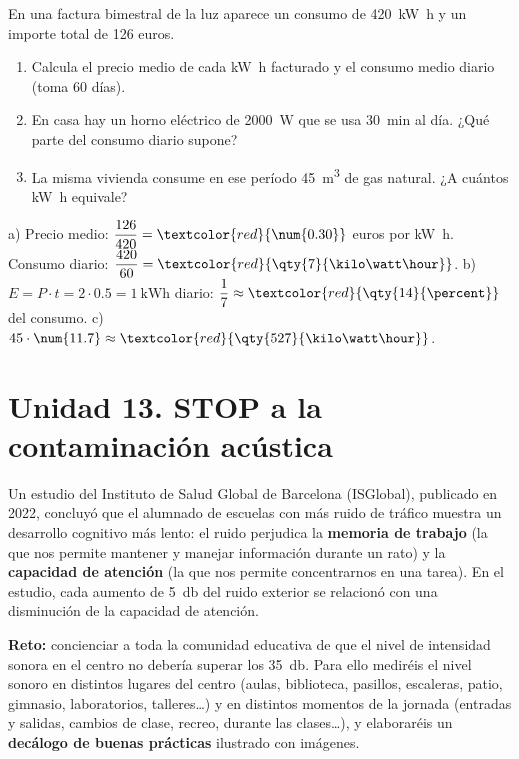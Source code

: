 \begin{exercise}
    En una factura bimestral de la luz aparece un consumo de \qty{420}{\kilo\watt\hour} y un importe total de 126 euros.
    \begin{enumerate}[label=\alph*)]
        \item Calcula el precio medio de cada \unit{\kilo\watt\hour} facturado y el consumo medio diario (toma 60 días).
        \item En casa hay un horno eléctrico de \qty{2000}{\watt} que se usa \qty{30}{\minute} al día. ¿Qué parte del consumo diario supone?
        \item La misma vivienda consume en ese período \qty{45}{\cubic\m} de gas natural. ¿A cuántos \unit{\kilo\watt\hour} equivale?
    \end{enumerate}
    \begin{solu}
        a) Precio medio: \(\dfrac{126}{420} = \textcolor{red}{\num{0.30}}\) euros por \unit{\kilo\watt\hour}. Consumo diario: \(\dfrac{420}{60} = \textcolor{red}{\qty{7}{\kilo\watt\hour}}\).
        b) \(E = P \cdot t = 2 \cdot \num{0.5} = \qty{1}{\kilo\watt\hour}\) diario: \(\dfrac{1}{7} \approx \textcolor{red}{\qty{14}{\percent}}\) del consumo.
        c) \(45 \cdot \num{11.7} \approx \textcolor{red}{\qty{527}{\kilo\watt\hour}}\).
    \end{solu}
\end{exercise}

\section[Unidad 13. STOP a la contaminación acústica]{Unidad 13. STOP a la contaminación acústica}

Un estudio del Instituto de Salud Global de Barcelona (ISGlobal), publicado en 2022, concluyó que el alumnado de escuelas con más ruido de tráfico muestra un desarrollo cognitivo más lento: el ruido perjudica la \textbf{memoria de trabajo} (la que nos permite mantener y manejar información durante un rato) y la \textbf{capacidad de atención} (la que nos permite concentrarnos en una tarea). En el estudio, cada aumento de \qty{5}{\decibel} del ruido exterior se relacionó con una disminución de la capacidad de atención.

\begin{marker}
    \textbf{Reto:} concienciar a toda la comunidad educativa de que el nivel de intensidad sonora en el centro no debería superar los \qty{35}{\decibel}. Para ello mediréis el nivel sonoro en distintos lugares del centro (aulas, biblioteca, pasillos, escaleras, patio, gimnasio, laboratorios, talleres\ldots) y en distintos momentos de la jornada (entradas y salidas, cambios de clase, recreo, durante las clases\ldots), y elaboraréis un \textbf{decálogo de buenas prácticas} ilustrado con imágenes.
\end{marker}

